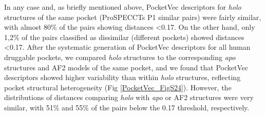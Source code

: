 In any case and, as briefly mentioned above, PocketVec descriptors for \textit{holo} structures of the same pocket (ProSPECCTs P1 similar pairs) were fairly similar, with almost 80\% of the pairs showing distances <0.17. On the other hand, only 1,2\% of the pairs classified as dissimilar (different pockets) showed distances <0.17. After the systematic generation of PocketVec descriptors for all human druggable pockets, we compared \textit{holo} structures to the corresponding \textit{apo} structures and AF2 models of the same pocket, and we found that PocketVec descriptors showed higher variability than within \textit{holo} structures, reflecting pocket structural heterogeneity (Fig \ref{PocketVec_FigS24}). However, the distributions of distances comparing \textit{holo} with \textit{apo} or AF2 structures were very similar, with 51\% and 55\% of the pairs below the 0.17 threshold, respectively. 

